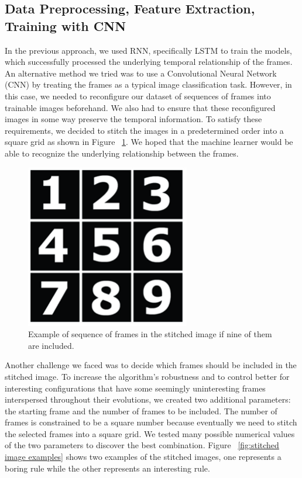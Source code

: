 \documentclass[12pt]{article}
\numberwithin{figure}{section} %
\begin{document}
\subsection{Data Preprocessing, Feature Extraction, Training with CNN}
In the previous approach, we used RNN, specifically LSTM to train the models, which successfully processed the underlying temporal relationship of the frames. An alternative method we tried was to use a Convolutional Neural Network (CNN) by treating the frames as a typical image classification task. However, in this case, we needed to reconfigure our dataset of sequences of frames into trainable images beforehand. We also had to ensure that these reconfigured images in some way preserve the temporal information. To satisfy these requirements, we decided to stitch the images in a predetermined order into a square grid as shown in Figure ~\ref{fig:stitched square grid}. We hoped that the machine learner would be able to recognize the underlying relationship between the frames. 
 
\begin{figure}[H]
\centering
\includegraphics[width=0.3\linewidth]{Section3/2}
\caption{Example of sequence of frames in the stitched image if nine of them are included.}
\vspace{-1.5em}
\label{fig:stitched square grid}
\end{figure}
Another challenge we faced was to decide which frames should be included in the stitched image. To increase the algorithm’s robustness and to control better for interesting configurations that have some seemingly uninteresting frames interspersed throughout their evolutions, we created two additional parameters: the starting frame and the number of frames to be included. The number of frames is constrained to be a square number because eventually we need to stitch the selected frames into a square grid. We tested many possible numerical values of the two parameters to discover the best combination. Figure ~\ref{fig:stitched image examples} shows two examples of the stitched images, one represents a boring rule while the other represents an interesting rule. 
\end{document}
